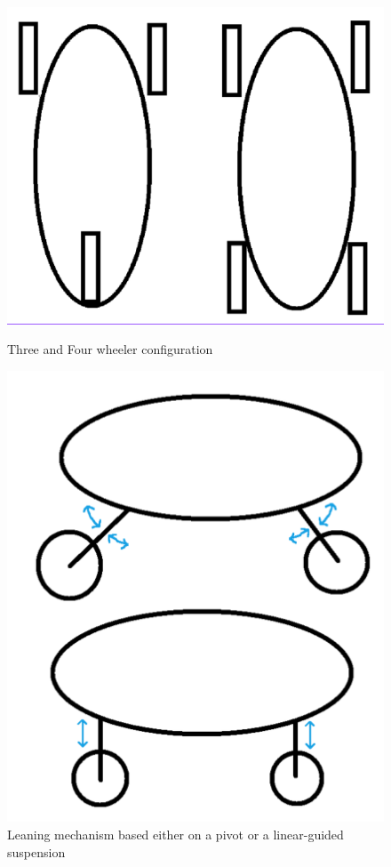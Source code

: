 \begin{figure}[h!]
    \centering
    \begin{minipage}{0.45\linewidth}
        \centering
        \includegraphics[width=\linewidth]{Figures/ch4_three_vs_four_wheel.png}
        \caption{Three and Four wheeler configuration}
        \label{fig:number_of_wheel}
    \end{minipage}
    \hfill
    \begin{minipage}{0.35\linewidth}
        \centering
        \includegraphics[width=\linewidth]{Figures/ch4_WheelMechanismHeightAdaption.png}
        \caption{Leaning mechanism based either on a pivot or a linear-guided suspension}
        \label{fig:leaning_mechanism}
    \end{minipage}
\end{figure}

